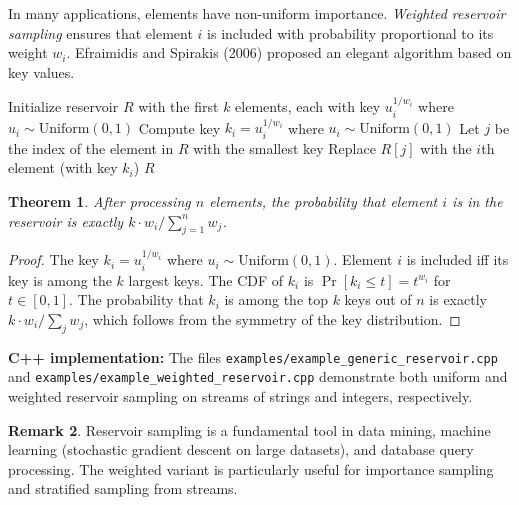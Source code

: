 \documentclass[twoside,12pt]{book}
\theoremstyle{plain}
\newtheorem{theorem}{Theorem}[chapter]
\theoremstyle{definition}
\newtheorem{remark}[theorem]{Remark}
\theoremstyle{remark}
\newenvironment{cpplisting}{\begin{center}\small}{\end{center}}
\begin{document}
In many applications, elements have non-uniform importance. \emph{Weighted reservoir sampling} ensures that element $i$ is included with probability proportional to its weight $w_i$. Efraimidis and Spirakis (2006) proposed an elegant algorithm based on key values.

\begin{algorithm}[htbp]
\caption{Weighted Reservoir Sampling (Algorithm~A-Res)}
\label{alg:weighted-reservoir}
\begin{algorithmic}[1]
\State Initialize reservoir $R$ with the first $k$ elements, each with key $u_i^{1/w_i}$ where $u_i \sim \text{Uniform}(0,1)$
  \State Compute key $k_i = u_i^{1/w_i}$ where $u_i \sim \text{Uniform}(0,1)$
  \State Let $j$ be the index of the element in $R$ with the smallest key
    \State Replace $R[j]$ with the $i$th element (with key $k_i$)
  \EndIf
\EndFor
\State \Return $R$
\end{algorithmic}
\end{algorithm}

\begin{theorem}\label{thm:weighted-reservoir}
After processing $n$ elements, the probability that element $i$ is in the reservoir is exactly $k \cdot w_i / \sum_{j=1}^n w_j$.
\end{theorem}

\begin{proof}
The key $k_i = u_i^{1/w_i}$ where $u_i \sim \text{Uniform}(0,1)$. Element $i$ is included iff its key is among the $k$ largest keys. The CDF of $k_i$ is $\Pr[k_i \leq t] = t^{w_i}$ for $t \in [0,1]$. The probability that $k_i$ is among the top $k$ keys out of $n$ is exactly $k \cdot w_i / \sum_j w_j$, which follows from the symmetry of the key distribution.
\end{proof}

\begin{cpplisting}
\textbf{C++ implementation:} The files \texttt{examples/example\_generic\_reservoir.cpp} and \texttt{examples/example\_weighted\_reservoir.cpp} demonstrate both uniform and weighted reservoir sampling on streams of strings and integers, respectively.
\end{cpplisting}

\begin{remark}
Reservoir sampling is a fundamental tool in data mining, machine learning (stochastic gradient descent on large datasets), and database query processing. The weighted variant is particularly useful for importance sampling and stratified sampling from streams.
\end{remark}
\end{document}

